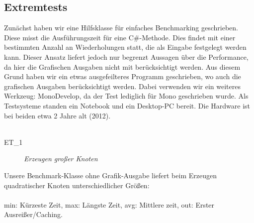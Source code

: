 %



\newpage



\label{Abschnitt:Tests:Protokoll:Extrem}



\subsection*{Extremtests}


Zunächst haben wir eine Hilfsklasse für einfaches Benchmarking geschrieben. Diese misst die Ausführungszeit für eine C\#-Methode. Dies findet mit einer bestimmten Anzahl an Wiederholungen statt, die als Eingabe festgelegt werden kann. Dieser Ansatz liefert jedoch nur begrenzt Aussagen über die Performance, da hier die Grafischen Ausgaben nicht mit berücksichtigt werden. Aus diesem Grund haben wir ein etwas ausgefeilteres Programm geschrieben, wo auch die grafischen Ausgaben berücksichtigt werden. Dabei verwenden wir ein weiteres Werkzeug: MonoDevelop, da der Test lediglich für Mono geschrieben wurde. Als Testsysteme standen ein Notebook und ein Desktop-PC bereit. Die Hardware ist bei beiden etwa 2 Jahre alt (2012).\\~\\


\label{Abschnitt:Tests:Protokoll:Extrem:Knoten_Erzeugen}

\begin{description}

	\item[ET\_1] \textit{Erzeugen großer Knoten}\hfill\\
	
\end{description}


\clearpage

Unsere Benchmark-Klasse ohne Grafik-Ausgabe liefert beim Erzeugen quadratischer Knoten unterschiedlicher Größen:\\~\\

\noindent
min: Kürzeste Zeit, max: Längste Zeit, avg: Mittlere zeit, out: Erster Ausreißer/Caching.\\


